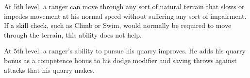 \begin{comment}
\begin{dtable}
\lcaption{Ranger Spells Known}
\begin{tabularx}{\columnwidth}{X *{4}{>{\ccol}X}}
& \multicolumn{4}{c}{\thead{---{}---{}---{}---{}---Spells Known---{}---{}---{}---{}---}} \\
\thead{Level} & \thead{1st} & \thead{2nd} & \thead{3rd} & \thead{4th} \\
1st  & \x & \x & \x & \x \\
2nd  & \x & \x & \x & \x \\
3rd  & \x & \x & \x & \x \\
4th  & 1 & \x & \x & \x \\
5th  & 2 & \x & \x & \x \\
6th  & 2 & \x & \x & \x \\
7th  & 3 & \x & \x & \x \\
8th  & 3 & 1 & \x & \x \\
9th  & 3 & 2 & \x & \x \\
10th & 4 & 2 & \x & \x \\
11th & 4 & 2 & 1 & \x \\
12th & 4 & 3 & 2 & \x \\
13th & 4 & 3 & 2 & \x \\
14th & 4 & 3 & 2 & 1 \\
15th & 4 & 3 & 3 & 2 \\
16th & 4 & 3 & 3 & 2 \\
17th & 4 & 3 & 3 & 2 \\
18th & 4 & 3 & 3 & 3 \\
19th & 4 & 3 & 3 & 3 \\
20th & 4 & 3 & 3 & 3 \\
\end{tabularx}
\end{dtable}
\end{comment}

 At 5th level, a ranger can move through any sort of natural terrain that slows or impedes movement at his normal speed without suffering any sort of impairment. If a skill check, such as Climb or Swim, would normally be required to move through the terrain, this ability does not help.

 At 5th level, a ranger's ability to pursue his quarry improves. He adds his quarry bonus as a competence bonus to his dodge modifier and saving throws against attacks that his quarry makes.


